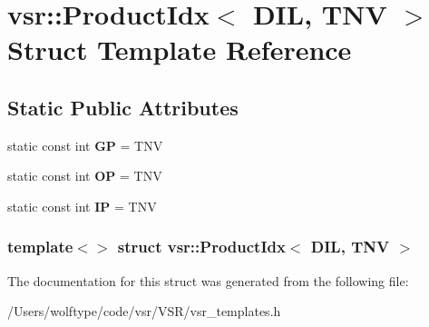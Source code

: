 \hypertarget{structvsr_1_1_product_idx_3_01_d_i_l_00_01_t_n_v_01_4}{\section{vsr\-:\-:Product\-Idx$<$ D\-I\-L, T\-N\-V $>$ Struct Template Reference}
\label{structvsr_1_1_product_idx_3_01_d_i_l_00_01_t_n_v_01_4}
}
\subsection*{Static Public Attributes}
\begin{DoxyCompactItemize}
\item 
\hypertarget{structvsr_1_1_product_idx_3_01_d_i_l_00_01_t_n_v_01_4_aba327bfd0da7eb5943bf35f4ac21d516}{static const int {\bfseries G\-P} = T\-N\-V}\label{structvsr_1_1_product_idx_3_01_d_i_l_00_01_t_n_v_01_4_aba327bfd0da7eb5943bf35f4ac21d516}

\item 
\hypertarget{structvsr_1_1_product_idx_3_01_d_i_l_00_01_t_n_v_01_4_ad2ead4bca6fb2850e0fd9b0a9a311259}{static const int {\bfseries O\-P} = T\-N\-V}\label{structvsr_1_1_product_idx_3_01_d_i_l_00_01_t_n_v_01_4_ad2ead4bca6fb2850e0fd9b0a9a311259}

\item 
\hypertarget{structvsr_1_1_product_idx_3_01_d_i_l_00_01_t_n_v_01_4_a24915cd2a4e1a49c3fd5286ed8420ee6}{static const int {\bfseries I\-P} = T\-N\-V}\label{structvsr_1_1_product_idx_3_01_d_i_l_00_01_t_n_v_01_4_a24915cd2a4e1a49c3fd5286ed8420ee6}

\end{DoxyCompactItemize}
\subsubsection*{template$<$$>$ struct vsr\-::\-Product\-Idx$<$ D\-I\-L, T\-N\-V $>$}



The documentation for this struct was generated from the following file\-:\begin{DoxyCompactItemize}
\item 
/\-Users/wolftype/code/vsr/\-V\-S\-R/vsr\-\_\-templates.\-h\end{DoxyCompactItemize}
